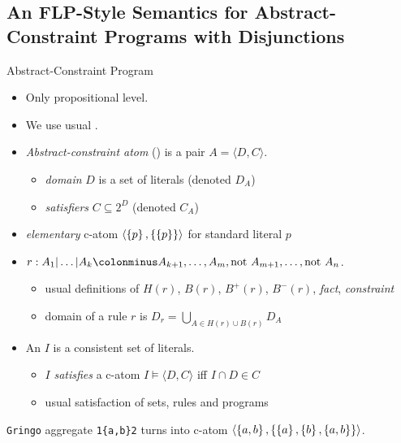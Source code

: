 \documentclass{beamer}
\newcommand{\catom}[2]{\ensuremath{\langle #1, #2 \rangle}}
\begin{document}
\subsection[Abstract-Constraint Semantics]{An FLP-Style Semantics for Abstract-Constraint Programs with Disjunctions}

\begin{frame}{Abstract-Constraint Program \cite{flp-for-acp}}

	\begin{itemize}
		\item Only propositional level.
		\pause
		\item We use usual .
		\pause
		\item \emph{Abstract-constraint atom} (\emph{}) is a pair $A = \catom{D}{C}$.
		\begin{itemize}
			\item \emph{domain} $D$ is a set of literals (denoted $D_A$)
			\item \emph{satisfiers} $C \subseteq 2^D$ (denoted $C_A$)
		\end{itemize}
		\pause
		\item \emph{elementary} c-atom $\catom{\set{p}}{\set{\set{p}}}$ for standard literal $p$
		\pause
		\item \emph{} $r : A_1 | \ldots | A_k \colonminus A_{k+1}, \ldots, A_m, \text{not } A_{m+1}, \ldots, \text{not } A_n$.
		\begin{itemize}
			\item usual definitions of $H(r)$, $B(r)$, $B^+(r)$, $B^-(r)$, \emph{fact}, \emph{constraint}
			\item domain of a rule $r$ is $D_r = \bigcup_{A \in H(r) \cup B(r)} D_A$
		\end{itemize}
		\pause
		\item An \emph{} $I$ is a consistent set of literals.
		\begin{itemize}
			\item $I$ \emph{satisfies} a c-atom $I \models \catom{D}{C}$ iff $I \cap D \in C$
			\item usual satisfaction of sets, rules and programs
		\end{itemize}
	\end{itemize}

	\pause

	\begin{example}
	\texttt{Gringo} aggregate \texttt{1\{a,b\}2}\newline
	turns into c-atom $\catom{\set{a,b}}{\set{\set{a}, \set{b}, \set{a,b}}}$.
	\end{example}

\end{frame}
\end{document}

